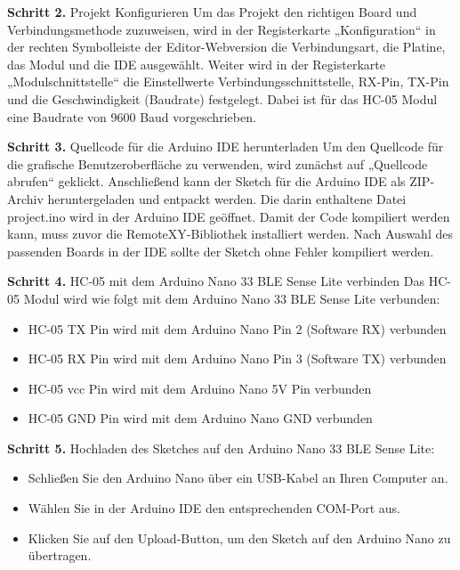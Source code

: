 \vspace{1\baselineskip}

\textbf{Schritt 2.} Projekt Konfigurieren
Um das Projekt den richtigen Board und Verbindungsmethode zuzuweisen, wird in der Registerkarte „Konfiguration“ in der rechten Symbolleiste der Editor-Webversion die Verbindungsart, die Platine, das Modul und die IDE ausgewählt.
Weiter wird in der Registerkarte „Modulschnittstelle“ die Einstellwerte Verbindungsschnittstelle, RX-Pin, TX-Pin und die Geschwindigkeit (Baudrate) festgelegt. Dabei ist für das HC-05 Modul eine Baudrate von 9600 Baud vorgeschrieben.
\cite{RemoteXY:Install}

\vspace{1\baselineskip}

\textbf{Schritt 3.} Quellcode für die Arduino IDE herunterladen
Um den Quellcode für die grafische Benutzeroberfläche zu verwenden, wird zunächst auf „Quellcode abrufen“ geklickt. Anschließend kann der Sketch für die Arduino IDE als ZIP-Archiv heruntergeladen und entpackt werden. Die darin enthaltene Datei project.ino wird in der Arduino IDE geöffnet. Damit der Code kompiliert werden kann, muss zuvor die RemoteXY-Bibliothek installiert werden. Nach Auswahl des passenden Boards in der IDE sollte der Sketch ohne Fehler kompiliert werden.
\cite{RemoteXY:Install}

\vspace{1\baselineskip}

\textbf{Schritt 4.} HC-05 mit dem Arduino Nano 33 BLE Sense Lite verbinden
Das HC-05 Modul wird wie folgt mit dem Arduino Nano 33 BLE Sense Lite verbunden:
\cite{RemoteXY:Install}
\begin{itemize}
    \item HC-05 TX Pin wird mit dem Arduino Nano Pin 2 (Software RX) verbunden
    
    \item 	HC-05 RX Pin wird mit dem Arduino Nano Pin 3 (Software TX) verbunden
    
    \item 		HC-05 \ac{vcc} Pin wird mit dem Arduino Nano 5V Pin verbunden
    
    \item 		HC-05 GND Pin wird mit dem Arduino Nano GND verbunden
\end{itemize}

\vspace{1\baselineskip}

\textbf{Schritt 5.} Hochladen des Sketches auf den Arduino Nano 33 BLE Sense Lite:
\cite{RemoteXY:Install}
\begin{itemize}
    \item Schließen Sie den Arduino Nano über ein USB-Kabel an Ihren Computer an.
    
    \item Wählen Sie in der Arduino IDE den entsprechenden COM-Port aus.
    
    \item Klicken Sie auf den Upload-Button, um den Sketch auf den Arduino Nano zu übertragen.
\end{itemize}

